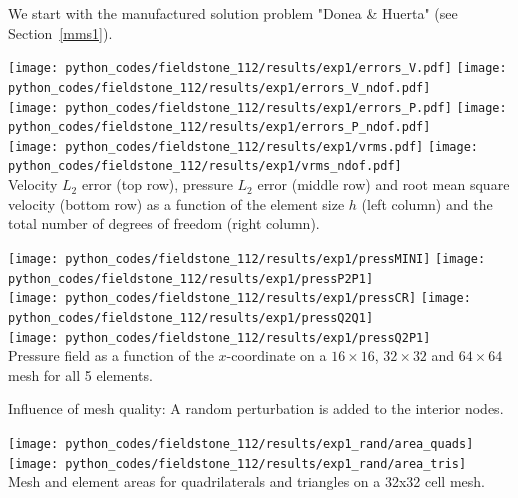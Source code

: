 We start with the manufactured solution problem "Donea \& Huerta" (see Section~\ref{mms1}).

\begin{center}
\texttt{[image: python\_codes/fieldstone\_112/results/exp1/errors\_V.pdf]}
\texttt{[image: python\_codes/fieldstone\_112/results/exp1/errors\_V\_ndof.pdf]}\\
\texttt{[image: python\_codes/fieldstone\_112/results/exp1/errors\_P.pdf]}
\texttt{[image: python\_codes/fieldstone\_112/results/exp1/errors\_P\_ndof.pdf]}\\
\texttt{[image: python\_codes/fieldstone\_112/results/exp1/vrms.pdf]}
\texttt{[image: python\_codes/fieldstone\_112/results/exp1/vrms\_ndof.pdf]}\\
{\captionfont Velocity $L_2$ error (top row), pressure $L_2$ error (middle row) and root
mean square velocity (bottom row) as a function of the element size $h$ (left column) 
and the total number of degrees of freedom (right column).}
\end{center}

\newpage
\begin{center}
\texttt{[image: python\_codes/fieldstone\_112/results/exp1/pressMINI]}
\texttt{[image: python\_codes/fieldstone\_112/results/exp1/pressP2P1]}\\
\texttt{[image: python\_codes/fieldstone\_112/results/exp1/pressCR]}
\texttt{[image: python\_codes/fieldstone\_112/results/exp1/pressQ2Q1]}\\
\texttt{[image: python\_codes/fieldstone\_112/results/exp1/pressQ2P1]}\\
{\captionfont Pressure field as a function of the $x$-coordinate on a $16\times16$,
$32\times 32$ and $64\times 64$ mesh for all 5 elements.} 
\end{center}

\newpage

Influence of mesh quality:
A random perturbation is added to the interior nodes. 

\begin{center}
\texttt{[image: python\_codes/fieldstone\_112/results/exp1\_rand/area\_quads]}
\texttt{[image: python\_codes/fieldstone\_112/results/exp1\_rand/area\_tris]}\\
{\captionfont Mesh and element areas for quadrilaterals and triangles on a 32x32 cell mesh.}
\end{center}

